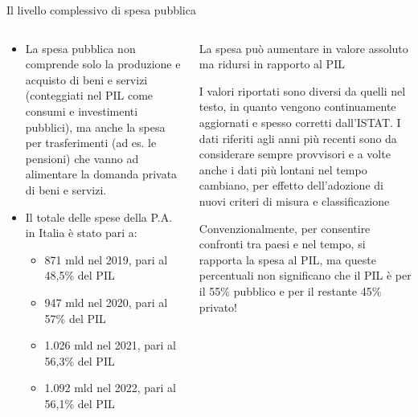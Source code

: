 \documentclass[aspectratio=64,12pt]{beamer}
\begin{document}
\begin{frame}{Il livello complessivo di spesa pubblica}
\begin{columns}
\begin{column}{.6\columnwidth}
\begin{itemize}
\item La spesa pubblica non comprende solo la produzione e acquisto di beni e
servizi (conteggiati nel PIL come consumi e investimenti pubblici),
ma anche la spesa per trasferimenti (ad es. le pensioni) che vanno ad
alimentare la domanda privata di beni e servizi.

\item Il totale delle spese della P.A. in Italia è stato pari a:
\begin{itemize}
\item 871 mld nel 2019, pari al 48,5\% del PIL
\item 947 mld nel 2020, pari al 57\% del PIL
\item 1.026 mld nel 2021, pari al 56,3\% del PIL
\item 1.092 mld nel 2022, pari al 56,1\% del PIL
\end{itemize}
\end{itemize}
\end{column}

\begin{column}{.4\columnwidth}
\begin{resize}{.9}
\begin{block}{}
\footnotesize
La spesa può aumentare in valore assoluto ma ridursi in rapporto al PIL
\end{block}

\begin{block}{}
  \footnotesize I valori riportati sono diversi da quelli nel testo, in quanto
  vengono continuamente aggiornati e spesso corretti dall’ISTAT.  I dati
  riferiti agli anni più recenti sono da considerare sempre provvisori e a
  volte anche i dati più lontani nel tempo cambiano, per effetto dell’adozione
  di nuovi criteri di misura e classificazione
\end{block}

\begin{block}{}
\footnotesize
Convenzionalmente, per consentire confronti tra paesi e nel tempo, si rapporta la spesa al PIL, ma queste percentuali \alert{non significano} che il PIL è per il 55\% pubblico e per il restante 45\% privato!
\end{block}
\end{resize}
\end{column}
\end{columns}
\end{frame}
\end{document}
